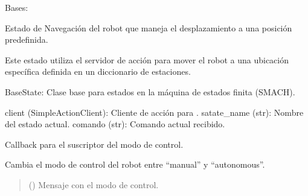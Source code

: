 \documentclass[a4paper,10pt,spanish]{sphinxmanual}
\begin{document}

\begin{fulllineitems}
\label{\detokenize{squad_state_manager:squad_state_manager.EstadoNavegacion}}
\pysigstartsignatures
{}
\pysigstopsignatures
\sphinxAtStartPar
Bases: {\hyperref[\detokenize{squad_state_manager:squad_state_manager.BaseState}]{}}

\sphinxAtStartPar
Estado de Navegación del robot que maneja el desplazamiento a una posición predefinida.

\sphinxAtStartPar
Este estado utiliza el servidor de acción  para mover el robot a una ubicación específica
definida en un diccionario de estaciones.
\begin{description}
\sphinxAtStartPar
BaseState: Clase base para estados en la máquina de estados finita (SMACH).

\sphinxAtStartPar
client (SimpleActionClient): Cliente de acción para .
satate\_name (str): Nombre del estado actual.
comando (str): Comando actual recibido.

\end{description}

\begin{fulllineitems}
\label{\detokenize{squad_state_manager:squad_state_manager.EstadoNavegacion.control_mode_callback}}
\pysigstartsignatures
{}
\pysigstopsignatures
\sphinxAtStartPar
Callback para el suscriptor del modo de control.

\sphinxAtStartPar
Cambia el modo de control del robot entre “manual” y “autonomous”.
\begin{quote}\begin{description}
\sphinxAtStartPar
{} () \textendash{} Mensaje con el modo de control.


\end{description}
\end{quote}
\end{fulllineitems}
\end{fulllineitems}
\end{document}
